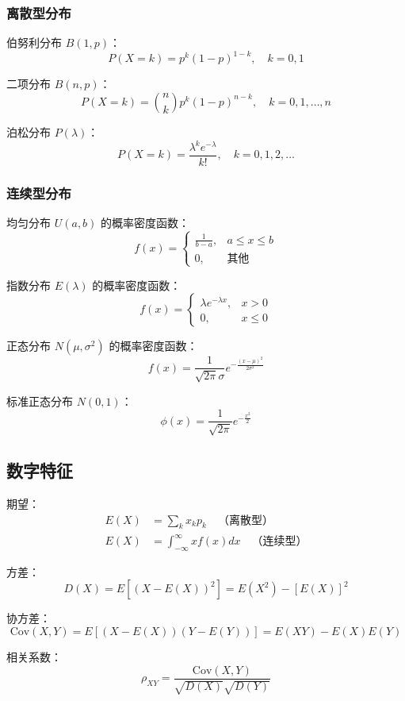 \documentclass[12pt]{article}
\begin{document}
\subsubsection{离散型分布}

伯努利分布 $B(1, p)$：
$$P(X = k) = p^k (1-p)^{1-k}, \quad k = 0, 1$$

二项分布 $B(n, p)$：
$$P(X = k) = \binom{n}{k} p^k (1-p)^{n-k}, \quad k = 0, 1, \ldots, n$$

泊松分布 $P(\lambda)$：
$$P(X = k) = \frac{\lambda^k e^{-\lambda}}{k!}, \quad k = 0, 1, 2, \ldots$$

\subsubsection{连续型分布}

均匀分布 $U(a, b)$ 的概率密度函数：
$$f(x) = \begin{cases}
\frac{1}{b-a}, & a \leq x \leq b \\
0, & \text{其他}
\end{cases}$$

指数分布 $E(\lambda)$ 的概率密度函数：
$$f(x) = \begin{cases}
\lambda e^{-\lambda x}, & x > 0 \\
0, & x \leq 0
\end{cases}$$

正态分布 $N(\mu, \sigma^2)$ 的概率密度函数：
$$f(x) = \frac{1}{\sqrt{2\pi}\sigma} e^{-\frac{(x-\mu)^2}{2\sigma^2}}$$

标准正态分布 $N(0, 1)$：
$$\phi(x) = \frac{1}{\sqrt{2\pi}} e^{-\frac{x^2}{2}}$$

\subsection{数字特征}

期望：
\begin{align}
E(X) &= \sum_{k} x_k p_k \quad \text{（离散型）} \\
E(X) &= \int_{-\infty}^{\infty} x f(x) dx \quad \text{（连续型）}
\end{align}

方差：
$$D(X) = E[(X - E(X))^2] = E(X^2) - [E(X)]^2$$

协方差：
$$\text{Cov}(X, Y) = E[(X - E(X))(Y - E(Y))] = E(XY) - E(X)E(Y)$$

相关系数：
$$\rho_{XY} = \frac{\text{Cov}(X, Y)}{\sqrt{D(X)} \sqrt{D(Y)}}$$

\end{document}
